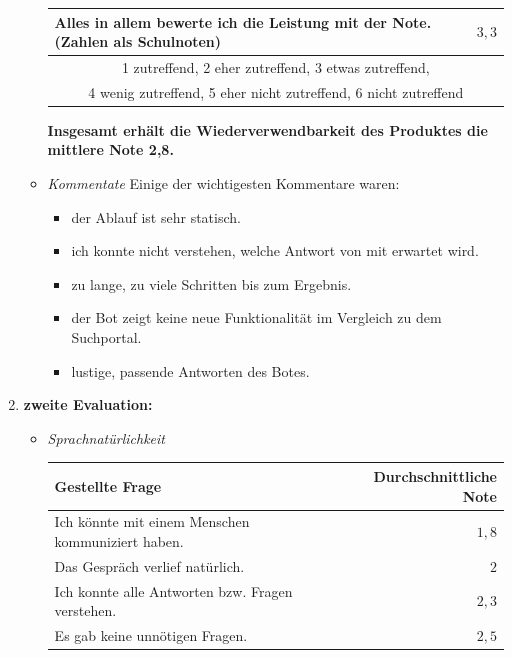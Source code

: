 \documentclass[12pt,a4paper]{scrartcl}
\begin{document}
\begin{enumerate}
\begin{itemize}
\begin{center}
\begin{tabularx}{\linewidth}{|X|c|}
Alles in allem bewerte ich die Leistung mit der Note.(Zahlen als Schulnoten) & $3,3$ \\ \hline
\multicolumn{2}{|c|}{1 zutreffend, 2 eher zutreffend, 3 etwas zutreffend,}\\
\multicolumn{2}{|c|}{4 wenig zutreffend, 5 eher nicht zutreffend, 6 nicht zutreffend} \\ \hline
\end{tabularx}
\end{center}
\textbf{Insgesamt erhält die Wiederverwendbarkeit des Produktes die mittlere Note 2,8.}
\item \textit{Kommentate}\newline
Einige der wichtigesten Kommentare waren:
\begin{itemize}
\item der Ablauf ist sehr statisch.
\item ich konnte nicht verstehen, welche Antwort von mit erwartet wird.
\item zu lange, zu viele Schritten bis zum Ergebnis.
\item der Bot zeigt keine neue Funktionalität im Vergleich zu dem Suchportal.
\item lustige, passende Antworten des Botes.
\end{itemize}

\end{itemize}






\item \textbf{zweite Evaluation:}
\begin{itemize}
\item \textit{Sprachnatürlichkeit}

\begin{center}
\begin{tabularx}{\linewidth}{|X|r|}
\hline
Gestellte Frage & Durchschnittliche Note  \\ \hline

Ich könnte mit einem Menschen kommuniziert haben. & $1,8$  \\ \hline

Das Gespräch verlief natürlich. & $2$   \\ \hline

Ich konnte alle Antworten bzw. Fragen verstehen. & $2,3$ \\ \hline

Es gab keine unnötigen Fragen. & $2,5$  \\ \hline



\end{tabularx}
\end{center}
\end{itemize}
\end{enumerate}
\end{document}
